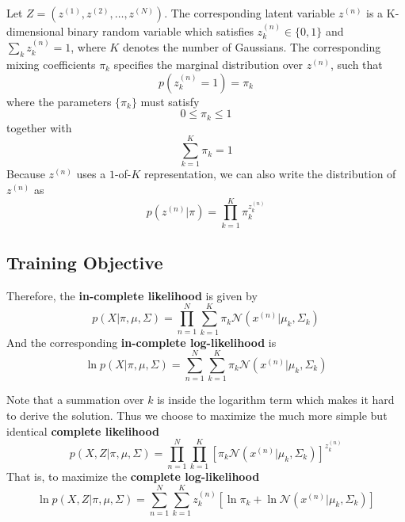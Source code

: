 \documentclass{article}
\begin{document}
\begin{spacing}{1.5}
Let $Z=(z^{(1)}, z^{(2)}, \dots, z^{(N)})$. The corresponding latent variable $z^{(n)}$ is a K-dimensional binary random variable which satisfies $z^{(n)}_k\in\{0,1\}$ and $\sum_k z^{(n)}_k = 1$, where $K$ denotes the number of Gaussians. The corresponding mixing coefficients $\pi_k$ specifies the marginal distribution over $z^{(n)}$, such that
\begin{equation}
p(z^{(n)}_k=1)=\pi_k
\end{equation} 
where the parameters $\{\pi_k\}$ must satisfy 
\begin{equation}
0 \leq \pi_k \leq 1
\end{equation}
together with
\begin{equation}
\sum_{k=1}^K \pi_k = 1
\end{equation}
Because $z^{(n)}$ uses a $1$-of-$K$ representation, we can also write the distribution of $z^{(n)}$ as
\begin{equation}
p(z^{(n)}|\pi)= \prod_{k=1}^K \pi_k^{z^{(n)}_k}
\end{equation}

\subsection{Training Objective}
Therefore, the \textbf{in-complete likelihood} is given by 
\begin{equation}
p(X|\pi,\mu,\Sigma) = \prod_{n=1}^N \sum_{k=1}^K \pi_k \mathcal{N}(x^{(n)}|\mu_k, \Sigma_k)
\end{equation}
And the corresponding \textbf{in-complete log-likelihood} is
\begin{equation}
\ln p(X|\pi,\mu,\Sigma) = \sum_{n=1}^N \sum_{k=1}^K \pi_k \mathcal{N}(x^{(n)}|\mu_k, \Sigma_k)
\end{equation}

Note that a summation over $k$ is inside the logarithm term which makes it hard to derive the solution. Thus we choose to maximize the much more simple but identical \textbf{complete likelihood}
\begin{equation}
p(X,Z|\pi,\mu,\Sigma)=\prod_{n=1}^N \prod_{k=1}^K [\pi_k \mathcal{N}(x^{(n)}|\mu_k,\Sigma_k)]^{z^{(n)}_k}
\end{equation}
That is, to maximize the \textbf{complete log-likelihood}
\begin{equation}
\ln p(X,Z|\pi,\mu,\Sigma)=\sum_{n=1}^N \sum_{k=1}^K z^{(n)}_k [\ln \pi_k + \ln \mathcal{N}(x^{(n)}|\mu_k, \Sigma_k)]
\end{equation}


\end{spacing}
\end{document}
